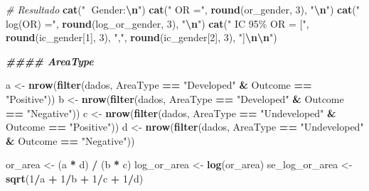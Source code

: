 \documentclass[
]{article}
\newenvironment{Shaded}{\begin{snugshade}}{\end{snugshade}}
\newcommand{\CommentTok}[1]{\textcolor[rgb]{0.56,0.35,0.01}{\textit{#1}}}
\newcommand{\DecValTok}[1]{\textcolor[rgb]{0.00,0.00,0.81}{#1}}
\newcommand{\DocumentationTok}[1]{\textcolor[rgb]{0.56,0.35,0.01}{\textbf{\textit{#1}}}}
\newcommand{\FunctionTok}[1]{\textcolor[rgb]{0.13,0.29,0.53}{\textbf{#1}}}
\newcommand{\NormalTok}[1]{#1}
\newcommand{\OtherTok}[1]{\textcolor[rgb]{0.56,0.35,0.01}{#1}}
\newcommand{\SpecialCharTok}[1]{\textcolor[rgb]{0.81,0.36,0.00}{\textbf{#1}}}
\newcommand{\StringTok}[1]{\textcolor[rgb]{0.31,0.60,0.02}{#1}}
\begin{document}
\begin{Shaded}
\begin{Highlighting}[]
\CommentTok{\# Resultado}
\FunctionTok{cat}\NormalTok{(}\StringTok{"🔹 Gender:}\SpecialCharTok{\textbackslash{}n}\StringTok{"}\NormalTok{)}
\FunctionTok{cat}\NormalTok{(}\StringTok{"  OR ="}\NormalTok{, }\FunctionTok{round}\NormalTok{(or\_gender, }\DecValTok{3}\NormalTok{), }\StringTok{"}\SpecialCharTok{\textbackslash{}n}\StringTok{"}\NormalTok{)}
\FunctionTok{cat}\NormalTok{(}\StringTok{"  log(OR) ="}\NormalTok{, }\FunctionTok{round}\NormalTok{(log\_or\_gender, }\DecValTok{3}\NormalTok{), }\StringTok{"}\SpecialCharTok{\textbackslash{}n}\StringTok{"}\NormalTok{)}
\FunctionTok{cat}\NormalTok{(}\StringTok{"  IC 95\% OR = ["}\NormalTok{, }\FunctionTok{round}\NormalTok{(ic\_gender[}\DecValTok{1}\NormalTok{], }\DecValTok{3}\NormalTok{), }\StringTok{","}\NormalTok{, }\FunctionTok{round}\NormalTok{(ic\_gender[}\DecValTok{2}\NormalTok{], }\DecValTok{3}\NormalTok{), }\StringTok{"]}\SpecialCharTok{\textbackslash{}n\textbackslash{}n}\StringTok{"}\NormalTok{)}


\DocumentationTok{\#\#\#\# AreaType}

\NormalTok{a }\OtherTok{\textless{}{-}} \FunctionTok{nrow}\NormalTok{(}\FunctionTok{filter}\NormalTok{(dados, AreaType }\SpecialCharTok{==} \StringTok{"Developed"} \SpecialCharTok{\&}\NormalTok{ Outcome }\SpecialCharTok{==} \StringTok{"Positive"}\NormalTok{))}
\NormalTok{b }\OtherTok{\textless{}{-}} \FunctionTok{nrow}\NormalTok{(}\FunctionTok{filter}\NormalTok{(dados, AreaType }\SpecialCharTok{==} \StringTok{"Developed"} \SpecialCharTok{\&}\NormalTok{ Outcome }\SpecialCharTok{==} \StringTok{"Negative"}\NormalTok{))}
\NormalTok{c }\OtherTok{\textless{}{-}} \FunctionTok{nrow}\NormalTok{(}\FunctionTok{filter}\NormalTok{(dados, AreaType }\SpecialCharTok{==} \StringTok{"Undeveloped"} \SpecialCharTok{\&}\NormalTok{ Outcome }\SpecialCharTok{==} \StringTok{"Positive"}\NormalTok{))}
\NormalTok{d }\OtherTok{\textless{}{-}} \FunctionTok{nrow}\NormalTok{(}\FunctionTok{filter}\NormalTok{(dados, AreaType }\SpecialCharTok{==} \StringTok{"Undeveloped"} \SpecialCharTok{\&}\NormalTok{ Outcome }\SpecialCharTok{==} \StringTok{"Negative"}\NormalTok{))}

\NormalTok{or\_area }\OtherTok{\textless{}{-}}\NormalTok{ (a }\SpecialCharTok{*}\NormalTok{ d) }\SpecialCharTok{/}\NormalTok{ (b }\SpecialCharTok{*}\NormalTok{ c)}
\NormalTok{log\_or\_area }\OtherTok{\textless{}{-}} \FunctionTok{log}\NormalTok{(or\_area)}
\NormalTok{se\_log\_or\_area }\OtherTok{\textless{}{-}} \FunctionTok{sqrt}\NormalTok{(}\DecValTok{1}\SpecialCharTok{/}\NormalTok{a }\SpecialCharTok{+} \DecValTok{1}\SpecialCharTok{/}\NormalTok{b }\SpecialCharTok{+} \DecValTok{1}\SpecialCharTok{/}\NormalTok{c }\SpecialCharTok{+} \DecValTok{1}\SpecialCharTok{/}\NormalTok{d)}


\end{Highlighting}
\end{Shaded}
\end{document}
